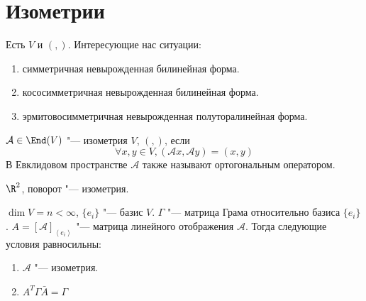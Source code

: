 \section{Изометрии}
Есть $V$ и $(,)$.
Интересующие нас ситуации:
\begin{enumerate}
    \item симметричная невырожденная билинейная форма.
    \item кососимметричная невырожденная билинейная форма.
    \item эрмитовосимметричная невырожденная полуторалинейная форма.
\end{enumerate}

\begin{Def}
	$\mathcal A \in \End(V)$ "--- изометрия $V$, $(,)$, если
	\[ \forall x, y \in V, (\mathcal A x, \mathcal A y) = (x, y) \]
	В Евклидовом пространстве $\mathcal A$ также называют ортогональным оператором.
\end{Def}

\begin{exmp}
	$\R^2$, поворот "--- изометрия.
\end{exmp}

\begin{theorem}
	$\dim V = n < \infty$, $\{e_i\} $ "--- базис $V$.
	$\Gamma$ "--- матрица Грама относительно базиса $\{e_i\}$.
	$A = [\mathcal A]_{\left<e_i\right>}$ "--- матрица линейного отображения $\mathcal A$.
	Тогда следующие условия равносильны:
	\begin{enumerate}
		\item $\mathcal A $ "--- изометрия.
		\item $A^T \Gamma \bar A = \Gamma$
	\end{enumerate}
\end{theorem}


